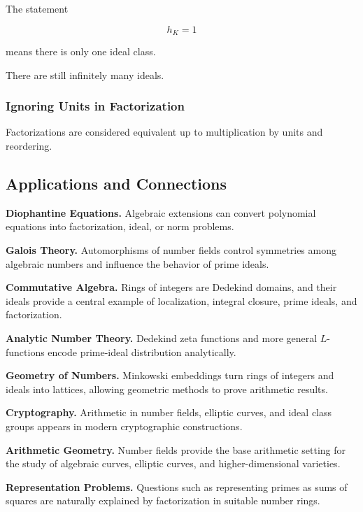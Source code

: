 The statement

\[ h_K=1 \]

means there is only one ideal class.

There are still infinitely many ideals.

\subsubsection{Ignoring Units in Factorization}

Factorizations are considered equivalent up to multiplication by units and
reordering.

\subsection{Applications and Connections}
\label{subsec:algebraic-number-theory-applications}

\begin{applicationbox}
\textbf{Diophantine Equations.}
Algebraic extensions can convert polynomial equations into factorization,
ideal, or norm problems.

\medskip

\textbf{Galois Theory.}
Automorphisms of number fields control symmetries among algebraic numbers and
influence the behavior of prime ideals.

\medskip

\textbf{Commutative Algebra.}
Rings of integers are Dedekind domains, and their ideals provide a central
example of localization, integral closure, prime ideals, and factorization.

\medskip

\textbf{Analytic Number Theory.}
Dedekind zeta functions and more general \(L\)-functions encode prime-ideal
distribution analytically.

\medskip

\textbf{Geometry of Numbers.}
Minkowski embeddings turn rings of integers and ideals into lattices,
allowing geometric methods to prove arithmetic results.

\medskip

\textbf{Cryptography.}
Arithmetic in number fields, elliptic curves, and ideal class groups appears
in modern cryptographic constructions.

\medskip

\textbf{Arithmetic Geometry.}
Number fields provide the base arithmetic setting for the study of algebraic
curves, elliptic curves, and higher-dimensional varieties.

\medskip

\textbf{Representation Problems.}
Questions such as representing primes as sums of squares are naturally
explained by factorization in suitable number rings.
\end{applicationbox}

